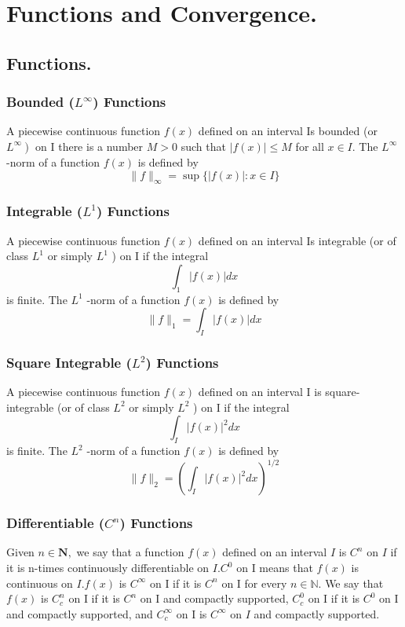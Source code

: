 \newpage
\section{Functions and Convergence.}
\subsection{Functions.}
\subsubsection{Bounded ($L^{\infty}$) Functions}
\begin{definition}
A piecewise continuous function $f(x)$ defined on an interval
Is bounded (or $\left.L^{\infty}\right)$ on I there is a number $M>0$ such that $|f(x)| \leq M$ for
all $x \in I .$
The $L^{\infty}$ -norm of a function $f(x)$ is defined by
$$
\|f\|_{\infty}=\sup \{|f(x)|: x \in I\}
$$
\end{definition}

\subsubsection{Integrable ($L^{1}$) Functions}
\begin{definition}
A piecewise continuous function $f(x)$ defined on an interval
Is integrable (or of class $L^{1}$ or simply $L^{1}$ ) on I if the integral
$$
\int_{1}|f(x)| d x
$$
is finite.
The $L^{1}$ -norm of a function $f(x)$ is defined by
$$
\|f\|_{1}=\int_{I}|f(x)| d x
$$
\end{definition}

\subsubsection{Square Integrable ($L^{2}$) Functions}
\begin{definition}
A piecewise continuous function $f(x)$ defined on an interval
I is square-integrable (or of class $L^{2}$ or simply $L^{2}$ ) on I if the integral
$$
\int_{I}|f(x)|^{2} d x
$$
is finite.
The $L^{2}$ -norm of a function $f(x)$ is defined by
$$
\|f\|_{2}=\left(\int_{I}|f(x)|^{2} d x\right)^{1 / 2}
$$
\end{definition}

\subsubsection{Differentiable ($C^{n}$) Functions}
\begin{definition}
Given $n \in \mathbf{N},$ we say that a function $f(x)$ defined on an
interval $I$ is $C^{n}$ on $I$ if it is n-times continuously differentiable on $I . C^{0}$ on I
means that $f(x)$ is continuous on $I . f(x)$ is $C^{\infty}$ on I if it is $C^{n}$ on I for every
$n \in \mathbb{N} .$
We say that $f(x)$ is $C_{c}^{n}$ on I if it is $C^{n}$ on I and compactly supported, $C_{c}^{0}$ on
I if it is $C^{0}$ on I and compactly supported, and $C_{c}^{\infty}$ on I is $C^{\infty}$ on $I$ and
compactly supported.
\end{definition}

